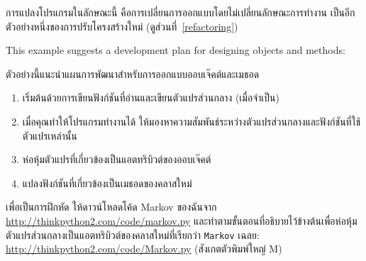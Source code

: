 การแปลงโปรแกรมในลักษณะนี้ คือการเปลี่ยนการออกแบบโดยไม่เปลี่ยนลักษณะการทำงาน เป็นอีกตัวอย่างหนึ่งของการปรับโครงสร้างใหม่ (ดูส่วนที่~\ref{refactoring})


This example suggests a development plan for designing objects and
methods:

ตัวอย่างนี้แนะนำแผนการพัฒนาสำหรับการออกแบบออบเจ๊คต์และเมธอด

\begin{enumerate}

\item เริ่มต้นด้วยการเขียนฟังก์ชันที่อ่านและเขียนตัวแปรส่วนกลาง (เมื่อจำเป็น)

\item เมื่อคุณทำให้โปรแกรมทำงานได้ ให้มองหาความสัมพันธ์ระหว่างตัวแปรส่วนกลางและฟังก์ชันที่ใช้ตัวแปรเหล่านั้น

\item ห่อหุ้มตัวแปรที่เกี่ยวข้องเป็นแอตทริบิวต์ของออบเจ๊คต์

\item แปลงฟังก์ชันที่เกี่ยวข้องเป็นเมธอดของคลาสใหม่

\end{enumerate}


เพื่อเป็นการฝึกหัด ให้ดาวน์โหลดโค้ด Markov ของฉันจาก \url{http://thinkpython2.com/code/markov.py} 
และทำตามขั้นตอนที่อธิบายไว้ข้างต้นเพื่อห่อหุ้มตัวแปรส่วนกลางเป็นแอตทริบิวต์ของคลาสใหม่ที่เรียกว่า {\tt Markov} 
เฉลย: \url{http://thinkpython2.com/code/Markov.py} (สังเกตตัวพิมพ์ใหญ่ M)



